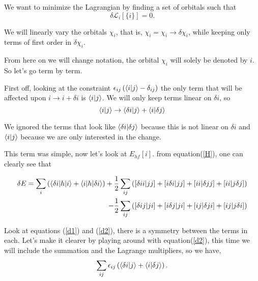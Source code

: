 \documentclass[a4paper]{article}
\begin{document}
We want to minimize the Lagrangian by finding a set of orbitals such that
$$
\delta \mathcal{L}_i \left[ \{i\} \right] = 0.
$$

We will linearly vary the orbitals $\chi_i$, that is, $\chi_i = \chi_i \rightarrow \delta\chi_i$, while keeping only terms of first order in $\delta\chi_i$.

From here on we will change notation, the orbital $\chi_i$ will solely be denoted by $i$.
So let's go term by term.



First off, looking at the constraint $\epsilon_{ij} \left(\braket{i | j} - \delta_{ij} \right)$ the only term that will be affected upon $i \rightarrow i + \delta i $ is $\braket{i | j}$.
We will only keep terms linear on $\delta i$, so
\begin{equation}\label{d2}
\braket{i | j} \rightarrow \braket{\delta i | j} + \braket{i | \delta j}
\end{equation}

We ignored the terms that look like $\braket{\delta i | \delta j}$ because this is not linear on $\delta i$ and $\braket{ i | j}$ because we are only interested in the change.

This term was simple, now let's look at $E_{hf} [{i}]$.
from equation(\ref{H}), one can clearly see that

\begin{equation}\label{d1}
\begin{split}
\delta E = \sum_i \left( \braket{\delta i | h | i} + \braket{i|h|\delta i} \right) +
\frac{1}{2}\sum_{ij} \left( [\delta i i | jj] + [i \delta i | jj] + [i i |\delta jj] + [ii | j\delta j]\right)\\
 - \frac{1}{2}\sum_{ij} \left( [\delta i j | ji] + [i \delta j | ji] + [i j |\delta ji] + [ij | j\delta i]\right)
\end{split}
\end{equation}

Look at equations (\ref{d1}) and (\ref{d2}), there is a symmetry between the terms in each.
Let's make it clearer by playing around with equation(\ref{d2}), this time we will include the summation and the Lagrange multipliers, so we have,
\begin{equation} \label{lagrange}
\sum_{ij} \epsilon_{ij} \left( \braket{\delta i | j} + \braket{i | \delta j} \right).
\end{equation}
\end{document}
